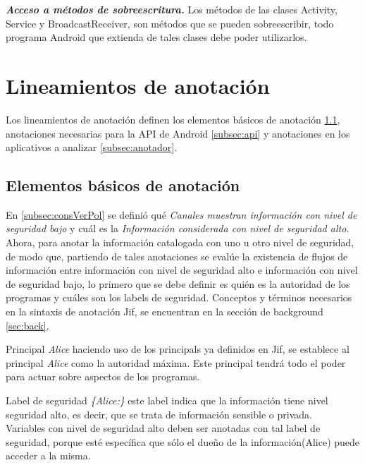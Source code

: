 \textit{\textbf{Acceso a métodos de sobreescritura.}}\newline
Los métodos de las clases Activity, Service y BroadcastReceiver, son métodos
que se pueden sobreescribir, todo programa Android que extienda de tales clases
debe poder utilizarlos.

\section{Lineamientos de anotación}
\label{sec:lineamientos}
Los lineamientos de anotación definen los elementos básicos de anotación
\ref{subsec:elements}, anotaciones necesarias para la API de Android
\ref{subsec:api} y anotaciones en los aplicativos a analizar \ref{subsec:anotador}.

\subsection{Elementos básicos de anotación}
\label{subsec:elements}
En \ref{subsec:consVerPol} se definió qué \textit{Canales muestran
información con nivel de seguridad bajo} y cuál es la \textit{Información
considerada con nivel de seguridad alto}. Ahora, para anotar la información
catalogada con uno u otro nivel de seguridad, de modo que, partiendo de tales
anotaciones se evalúe la existencia de flujos de información entre información
con nivel de seguridad alto e información con nivel de seguridad bajo, lo primero
que se debe definir es quién es la autoridad de los programas y cuáles son los
labels de seguridad.\newline
Conceptos y términos necesarios en la sintaxis de anotación Jif, se
encuentran en la sección de background \ref{sec:back}.

Principal \emph{Alice}\newline
haciendo uso de los principals ya definidos en Jif, se establece al principal
\emph{Alice} como la autoridad máxima. Este principal tendrá todo el poder para
actuar sobre aspectos de los programas.

Label de seguridad \emph{\{Alice:\}}\newline
este label indica que la información tiene nivel seguridad alto, es decir, que
se trata de información sensible o privada.\\
Variables con nivel de seguridad alto deben ser anotadas con tal label de
seguridad, porque esté específica que sólo el dueño de la información(Alice)
puede acceder a la misma. 

